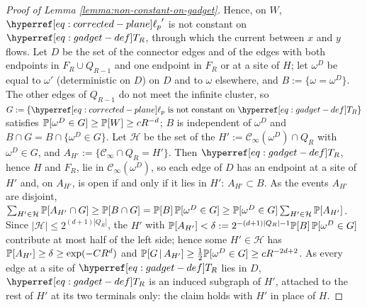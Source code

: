 \documentclass[12pt]{amsart}
\numberwithin{equation}{section}
\begin{document}
\begin{proof}[Proof of Lemma \ref{lemma:non-constant-on-gadget}]
		Hence, on $W$, ${\ellp{p}}'$ is not constant on $\Tn{R}$, through which the current between $x$ and $y$ flows. Let $D$ be the set of the connector edges and of the edges with both endpoints in $F_R \cup Q_{R-1}$ and one endpoint in $F_R$ or at a site of $H$; let $\omega^D$ be equal to $\omega'$ (deterministic on $D$) on $D$ and to $\omega$ elsewhere, and $B := \{ \omega = \omega^D \}$. The other edges of $Q_{R-1}$ do not meet the infinite cluster, so $G := \{ \ellp{p} ~\mbox{is not constant on}~ \Tn{R} \}$ satisfies $\P[\omega^D \in G] \geq \P[W] \geq c R^{-d}$; $B$ is independent of $\omega^D$ and $B \cap G = B \cap \{ \omega^D \in G \}$. Let $\mathcal{H}$ be the set of the $H' := \mathscr{C}_{\infty}(\omega^D) \cap Q_R$ with $\omega^D \in G$, and $A_{H'} := \{ \mathscr{C}_{\infty} \cap Q_R = H' \}$. Then $\Tn{R}$, hence $H$ and $F_R$, lie in $\mathscr{C}_{\infty}(\omega^D)$, so each edge of $D$ has an endpoint at a site of $H'$ and, on $A_{H'}$, is open if and only if it lies in $H'$: $A_{H'} \subset B$. As the events $A_{H'}$ are disjoint, $\sum_{H' \in \mathcal{H}} \P[A_{H'} \cap G] \geq \P[B \cap G] = \P[B] \, \P[\omega^D \in G] \geq \P[\omega^D \in G] \sum_{H' \in \mathcal{H}} \P[A_{H'}]$. Since $|\mathcal{H}| \leq 2^{(d+1) |Q_R|}$, the $H'$ with $\P[A_{H'}] < \delta := 2^{-(d+1)|Q_R| - 1} \P[B] \, \P[\omega^D \in G]$ contribute at most half of the left side; hence some $H' \in \mathcal{H}$ has $\P[A_{H'}] \geq \delta \geq \exp(-C R^d)$ and $\P[ G \, | \, A_{H'} ] \geq \frac12 \P[\omega^D \in G] \geq c R^{-2d+2}$. As every edge at a site of $\Tn{R}$ lies in $D$, $\Tn{R}$ is an induced subgraph of $H'$, attached to the rest of $H'$ at its two terminals only: the claim holds with $H'$ in place of $H$. 
	\end{proof}
	
	
	
\end{document}
